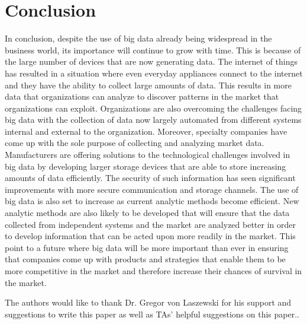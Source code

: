 \documentclass[sigconf]{acmart}
\begin{document}
\section{Conclusion}
In conclusion, despite the use of big data already being widespread in the business world, its importance will continue to grow with time. This is because of the large number of devices that are now generating data. The internet of things has resulted in a situation where even everyday appliances connect to the internet and they have the ability to collect large amounts of data. This results in more data that organizations can analyze to discover patterns in the market that organizations can exploit. Organizations are also overcoming the challenges facing big data with the collection of data now largely automated from different systems internal and external to the organization. 
Moreover, specialty companies have come up with the sole purpose of collecting and analyzing market data. Manufacturers are offering solutions to the technological challenges involved in big data by developing larger storage devices that are able to store increasing amounts of data efficiently. The security of such information has seen significant improvements with more secure communication and storage channels. The use of big data is also set to increase as current analytic methods become efficient. New analytic methods are also likely to be developed that will ensure that the data collected from independent systems and the market are analyzed better in order to develop information that can be acted upon more readily in the market. This point to a future where big data will be more important than ever in ensuring that companies come up with products and strategies that enable them to be more competitive in the market and therefore increase their chances of survival in the market.





\begin{acks}

  The authors would like to thank Dr. Gregor von Laszewski for his support and suggestions to write this paper as well as TAs' helpful suggestions on this paper.. 

\end{acks}


 
\end{document}
